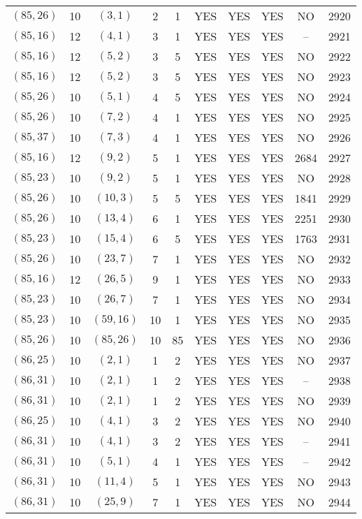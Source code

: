\begin{longtable}{|c|c|c|c|c|c|c|c|c|c|}
$(85, 26)$ & 10 & $(3, 1)$ & 2 & 1 & YES & YES & YES & NO & 2920\\
$(85, 16)$ & 12 & $(4, 1)$ & 3 & 1 & YES & YES & YES & -- & 2921\\
$(85, 16)$ & 12 & $(5, 2)$ & 3 & 5 & YES & YES & YES & NO & 2922\\
$(85, 16)$ & 12 & $(5, 2)$ & 3 & 5 & YES & YES & YES & NO & 2923\\
$(85, 26)$ & 10 & $(5, 1)$ & 4 & 5 & YES & YES & YES & NO & 2924\\
$(85, 26)$ & 10 & $(7, 2)$ & 4 & 1 & YES & YES & YES & NO & 2925\\
$(85, 37)$ & 10 & $(7, 3)$ & 4 & 1 & YES & YES & YES & NO & 2926\\
$(85, 16)$ & 12 & $(9, 2)$ & 5 & 1 & YES & YES & YES & 2684 & 2927\\
$(85, 23)$ & 10 & $(9, 2)$ & 5 & 1 & YES & YES & YES & NO & 2928\\
$(85, 26)$ & 10 & $(10, 3)$ & 5 & 5 & YES & YES & YES & 1841 & 2929\\
$(85, 26)$ & 10 & $(13, 4)$ & 6 & 1 & YES & YES & YES & 2251 & 2930\\
$(85, 23)$ & 10 & $(15, 4)$ & 6 & 5 & YES & YES & YES & 1763 & 2931\\
$(85, 26)$ & 10 & $(23, 7)$ & 7 & 1 & YES & YES & YES & NO & 2932\\
$(85, 16)$ & 12 & $(26, 5)$ & 9 & 1 & YES & YES & YES & NO & 2933\\
$(85, 23)$ & 10 & $(26, 7)$ & 7 & 1 & YES & YES & YES & NO & 2934\\
$(85, 23)$ & 10 & $(59, 16)$ & 10 & 1 & YES & YES & YES & NO & 2935\\
$(85, 26)$ & 10 & $(85, 26)$ & 10 & 85 & YES & YES & YES & NO & 2936\\
$(86, 25)$ & 10 & $(2, 1)$ & 1 & 2 & YES & YES & YES & NO & 2937\\
$(86, 31)$ & 10 & $(2, 1)$ & 1 & 2 & YES & YES & YES & -- & 2938\\
$(86, 31)$ & 10 & $(2, 1)$ & 1 & 2 & YES & YES & YES & NO & 2939\\
$(86, 25)$ & 10 & $(4, 1)$ & 3 & 2 & YES & YES & YES & NO & 2940\\
$(86, 31)$ & 10 & $(4, 1)$ & 3 & 2 & YES & YES & YES & -- & 2941\\
$(86, 31)$ & 10 & $(5, 1)$ & 4 & 1 & YES & YES & YES & -- & 2942\\
$(86, 31)$ & 10 & $(11, 4)$ & 5 & 1 & YES & YES & YES & NO & 2943\\
$(86, 31)$ & 10 & $(25, 9)$ & 7 & 1 & YES & YES & YES & NO & 2944\\

\end{longtable}
